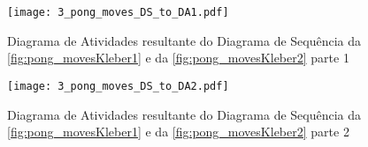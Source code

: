	\begin{figure}[H]
		\centering
		\texttt{[image: 3\_pong\_moves\_DS\_to\_DA1.pdf]}
		\caption{Diagrama de Atividades resultante do Diagrama de Sequência da \ref{fig:pong_movesKleber1} e da \ref{fig:pong_movesKleber2} parte 1}
		\label{fig:pong_movesDS_to_DA1}
	\end{figure}
\begin{landscape}
	\begin{figure}[H]
		\centering
		\texttt{[image: 3\_pong\_moves\_DS\_to\_DA2.pdf]}
		\caption{Diagrama de Atividades resultante do Diagrama de Sequência da \ref{fig:pong_movesKleber1} e da \ref{fig:pong_movesKleber2} parte 2}
		\label{fig:pong_movesDS_to_DA2}
	\end{figure}
\end{landscape}



